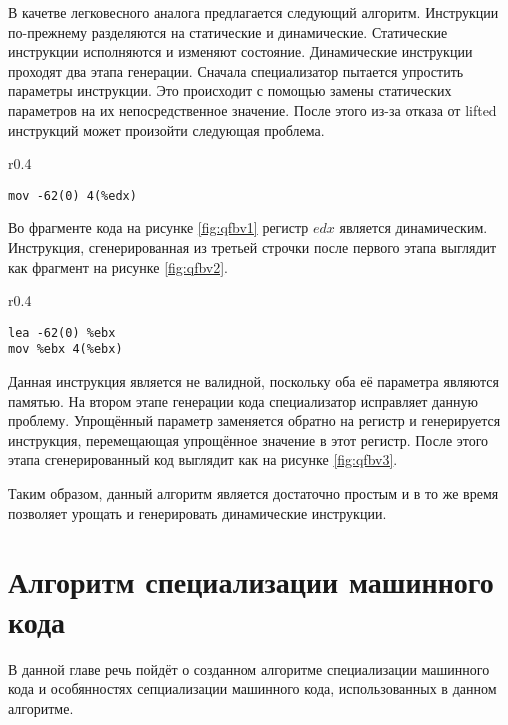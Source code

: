 \documentclass{spbau-diploma}
\begin{document}
В качетве легковесного аналога предлагается следующий алгоритм. Инструкции по-прежнему разделяются на статические и динамические. Статические инструкции исполняются и изменяют состояние. Динамические инструкции проходят два этапа генерации. Сначала специализатор пытается упростить параметры инструкции. Это происходит с помощью замены статических параметров на их непосредственное значение. После этого из-за отказа от lifted инструкций может произойти следующая проблема. 
\begin{wrapfigure}{r}{0.4\textwidth}
\begin{lstlisting}[xleftmargin = 20pt]
mov -62(0) 4(%edx)
\end{lstlisting}
\caption{Фрагмент кода}
\label{fig:qfbv2}
\end{wrapfigure}
Во фрагменте кода на рисунке \ref{fig:qfbv1} регистр $edx$ является динамическим. Инструкция, сгенерированная из третьей строчки после первого этапа выглядит как фрагмент на рисунке \ref{fig:qfbv2}. 
\begin{wrapfigure}{r}{0.4\textwidth}
\begin{lstlisting}[xleftmargin = 20pt]
lea -62(0) %ebx 
mov %ebx 4(%ebx)
\end{lstlisting}
\caption{Фрагмент кода}
\label{fig:qfbv3}
\end{wrapfigure}
Данная инструкция является не валидной, поскольку оба её параметра являются памятью. На втором этапе генерации кода специализатор исправляет данную проблему. Упрощённый параметр заменяется обратно на регистр и генерируется инструкция, перемещающая упрощённое значение в этот регистр. После этого этапа сгенерированный код выглядит как на рисунке \ref{fig:qfbv3}.

Таким образом, данный алгоритм является достаточно простым и в то же время позволяет урощать и генерировать динамические инструкции.

\section{ Алгоритм специализации машинного кода}
В данной главе речь пойдёт о созданном алгоритме специализации машинного кода и особянностях сепциализации машинного кода, использованных в данном алгоритме.
\end{document}
